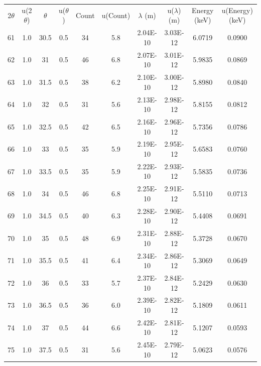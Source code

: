 \documentclass[justified]{tufte-book}
\begin{document}
\begin{table}[ht]
\center
\begin{tabular}{cccccccccc}
2$\theta$ & u(2$\theta$) & $\theta$ & u($\theta$) & Count & u(Count) & $\lambda$ (m) & u($\lambda$) (m) & Energy (keV) & u(Energy) (keV) \\
61        & 1.0 & 30.5     & 0.5         & 34    & 5.8      & 2.04E-10      & 3.03E-12         & 6.0719       & 0.0900 \\
62        & 1.0 & 31       & 0.5         & 46    & 6.8      & 2.07E-10      & 3.01E-12         & 5.9835       & 0.0869 \\
63        & 1.0 & 31.5     & 0.5         & 38    & 6.2      & 2.10E-10      & 3.00E-12         & 5.8980       & 0.0840 \\
64        & 1.0 & 32       & 0.5         & 31    & 5.6      & 2.13E-10      & 2.98E-12         & 5.8155       & 0.0812 \\
65        & 1.0 & 32.5     & 0.5         & 42    & 6.5      & 2.16E-10      & 2.96E-12         & 5.7356       & 0.0786 \\
66        & 1.0 & 33       & 0.5         & 35    & 5.9      & 2.19E-10      & 2.95E-12         & 5.6583       & 0.0760 \\
67        & 1.0 & 33.5     & 0.5         & 35    & 5.9      & 2.22E-10      & 2.93E-12         & 5.5835       & 0.0736 \\
68        & 1.0 & 34       & 0.5         & 46    & 6.8      & 2.25E-10      & 2.91E-12         & 5.5110       & 0.0713 \\
69        & 1.0 & 34.5     & 0.5         & 40    & 6.3      & 2.28E-10      & 2.90E-12         & 5.4408       & 0.0691 \\
70        & 1.0 & 35       & 0.5         & 48    & 6.9      & 2.31E-10      & 2.88E-12         & 5.3728       & 0.0670 \\
71        & 1.0 & 35.5     & 0.5         & 41    & 6.4      & 2.34E-10      & 2.86E-12         & 5.3069       & 0.0649 \\
72        & 1.0 & 36       & 0.5         & 33    & 5.7      & 2.37E-10      & 2.84E-12         & 5.2429       & 0.0630 \\
73        & 1.0 & 36.5     & 0.5         & 36    & 6.0      & 2.39E-10      & 2.82E-12         & 5.1809       & 0.0611 \\
74        & 1.0 & 37       & 0.5         & 44    & 6.6      & 2.42E-10      & 2.81E-12         & 5.1207       & 0.0593 \\
75        & 1.0 & 37.5     & 0.5         & 31    & 5.6      & 2.45E-10      & 2.79E-12         & 5.0623       & 0.0576 \\

\end{tabular}
\end{table}
\end{document}

